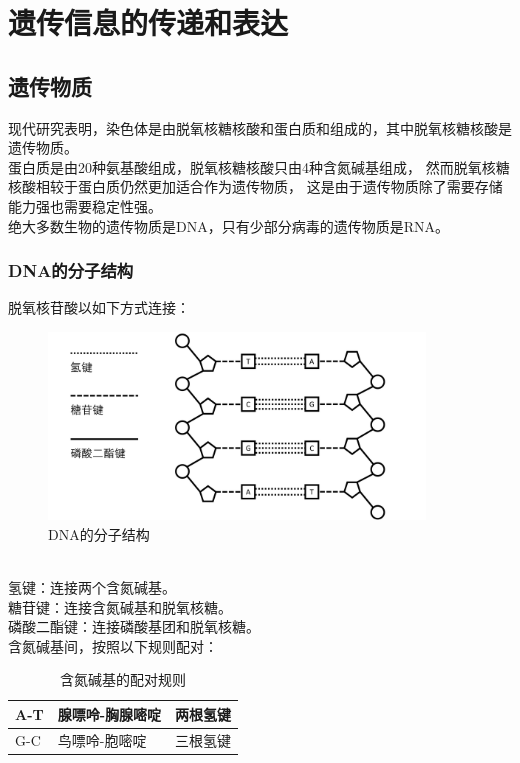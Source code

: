 \documentclass[UTF8]{ctexart}
\begin{document}
\newpage

\section{遗传信息的传递和表达}

\subsection{遗传物质}
    现代研究表明，染色体是由脱氧核糖核酸和蛋白质和组成的，其中脱氧核糖核酸是遗传物质。\\[3mm]
    蛋白质是由20种氨基酸组成，脱氧核糖核酸只由4种含氮碱基组成，
    然而脱氧核糖核酸相较于蛋白质仍然更加适合作为遗传物质，
    这是由于遗传物质除了需要存储能力强也需要稳定性强。\\[3mm]
    绝大多数生物的遗传物质是DNA，只有少部分病毒的遗传物质是RNA。

\subsubsection{DNA的分子结构}
    脱氧核苷酸以如下方式连接：\vspace{5pt}
    \begin{figure}[h!]
        \begin{center}
            \includegraphics[width=10cm]{BiologyImage/23.jpg}
            \caption{DNA的分子结构}
        \end{center}
    \end{figure}\\
    氢键：连接两个含氮碱基。\\[3mm]
    糖苷键：连接含氮碱基和脱氧核糖。\\[3mm]
    磷酸二酯键：连接磷酸基团和脱氧核糖。\\[6mm]
    含氮碱基间，按照以下规则配对：
    \begin{table}[h!]
        \begin{center}
            \begin{tabular}{l|l|l}
                \hline
                A-T\qquad\qquad&腺嘌呤-胸腺嘧啶\qquad\qquad&两根氢键\qquad\qquad\\ \hline
                G-C\qquad\qquad&鸟嘌呤-胞嘧啶\qquad\qquad&三根氢键\qquad\qquad\\ \hline
            \end{tabular}
            \caption{含氮碱基的配对规则}
        \end{center}
    \end{table}
\end{document}
